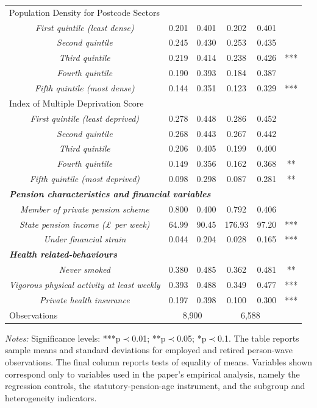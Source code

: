\documentclass[arguments, manuscript, 11pt]{aastex631}
\begin{document}
\begin{table}[!htbp]
{\begin{tabular}{@{}cccccc@{}}
\multicolumn{6}{l}{Population Density for Postcode Sectors} \\
\textit{First quintile (least dense)} & 0.201 & 0.401 & 0.202 & 0.401 &  \\
\textit{Second quintile} & 0.245 & 0.430 & 0.253 & 0.435 &  \\
\textit{Third quintile} & 0.219 & 0.414 & 0.238 & 0.426 & *** \\
\textit{Fourth quintile} & 0.190 & 0.393 & 0.184 & 0.387 &  \\
\textit{Fifth quintile (most dense)} & 0.144 & 0.351 & 0.123 & 0.329 & *** \\
\multicolumn{6}{l}{Index of Multiple Deprivation Score} \\
\textit{First quintile (least deprived)} & 0.278 & 0.448 & 0.286 & 0.452 &  \\
\textit{Second quintile} & 0.268 & 0.443 & 0.267 & 0.442 &  \\
\textit{Third quintile} & 0.206 & 0.405 & 0.199 & 0.400 &  \\
\textit{Fourth quintile} & 0.149 & 0.356 & 0.162 & 0.368 & ** \\
\textit{Fifth quintile (most deprived)} & 0.098 & 0.298 & 0.087 & 0.281 & ** \\\hline
\multicolumn{6}{l}{\textit{\textbf{Pension characteristics and financial variables}}} \\\hline
\textit{Member of private pension scheme} & 0.800 & 0.400 & 0.792 & 0.406 &  \\
\textit{State pension income (£ per week)} & 64.99 & 90.45 & 176.93 & 97.20 & *** \\
\textit{Under financial strain} & 0.044 & 0.204 & 0.028 & 0.165 & *** \\\hline
\multicolumn{6}{l}{\textit{\textbf{Health related-behaviours}}} \\\hline
\textit{Never smoked} & 0.380 & 0.485 & 0.362 & 0.481 & ** \\
\textit{Vigorous physical activity at least weekly} & 0.393 & 0.488 & 0.349 & 0.477 & *** \\
\textit{Private health insurance} & 0.197 & 0.398 & 0.100 & 0.300 & *** \\\hline
\multicolumn{1}{l}{Observations} & \multicolumn{2}{c}{8,900} & \multicolumn{2}{c}{6,588} &  \\ \bottomrule \bottomrule
\end{tabular}%
}
\tiny{{\singlespacing \emph{Notes:} Significance levels: ***p$\prec$0.01; **p$\prec$0.05; *p$\prec$0.1. The table reports sample means and standard deviations for employed and retired person-wave observations. The final column reports tests of equality of means. Variables shown correspond only to variables used in the paper's empirical analysis, namely the regression controls, the statutory-pension-age instrument, and the subgroup and heterogeneity indicators.}}
\end{table}
\end{document}
